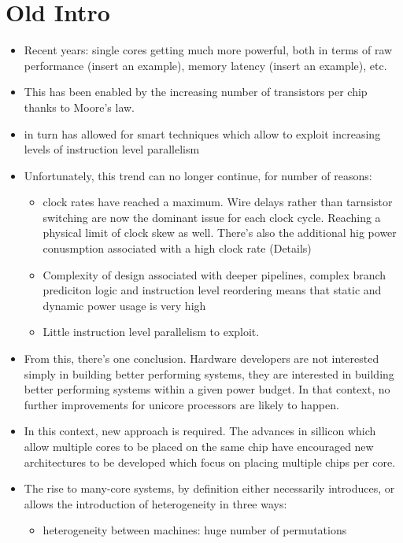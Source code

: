 

\section{Old Intro}
\begin{itemize}
\item Recent years: single cores getting much more powerful,
both in terms of raw performance (insert an example), 
memory latency (insert an example), etc.
\item This has been enabled by the increasing
number of transistors per chip thanks to Moore's law. 
\item in turn has allowed for 
smart techniques which allow to exploit increasing
levels of instruction level parallelism 
\item Unfortunately, this trend can no longer
continue, for number of reasons:
\begin{itemize}
\item clock rates have reached a maximum. Wire delays
rather than tarnsistor switching are now the dominant
issue for each clock cycle. Reaching a physical limit of clock
skew as well.  
There's also the additional hig power conusmption associated
with a high clock rate (Details) 
\item Complexity of design associated with deeper pipelines,
complex branch prediciton logic and instruction level reordering
means that static and dynamic power usage is very high
\item Little instruction level parallelism to exploit.  
\end{itemize}
\item From this, there's one conclusion. Hardware developers are not 
interested simply in building better performing systems, they 
are interested in building better performing systems within a given
power budget. In that context, no further improvements for unicore
processors are likely to happen. 
\item In this context, new approach is required. The advances
in sillicon which allow multiple cores to be placed on the same
chip have encouraged new architectures to be developed
which focus on placing multiple chips per core. 
\item The rise to many-core systems, by definition either necessarily 
introduces, or allows the introduction of heterogeneity in three ways: 
\begin{itemize}
\item heterogeneity between machines: huge number of permutations

\end{itemize}
\end{itemize}
